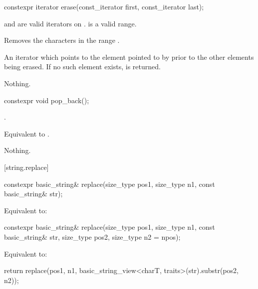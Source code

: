 %
\begin{itemdecl}
constexpr iterator erase(const_iterator first, const_iterator last);
\end{itemdecl}

\begin{itemdescr}
\pnum
\expects
{} and  are valid iterators on
.  is a valid range.

\pnum
\effects
Removes the characters in the range
\tcode{[first, last)}.

\pnum
\returns
An iterator which points to the element pointed to by  prior to
the other elements being erased.
If no such element exists,
is returned.

\pnum
\throws
Nothing.
\end{itemdescr}

%
\begin{itemdecl}
constexpr void pop_back();
\end{itemdecl}

\begin{itemdescr}
\pnum
\expects
{}.

\pnum
\effects
Equivalent to .

\pnum
\throws
Nothing.
\end{itemdescr}

[string.replace]{}

%
\begin{itemdecl}
constexpr basic_string& replace(size_type pos1, size_type n1, const basic_string& str);
\end{itemdecl}

\begin{itemdescr}
\pnum
\effects
Equivalent to: 
\end{itemdescr}

%
\begin{itemdecl}
constexpr basic_string& replace(size_type pos1, size_type n1, const basic_string& str,
                                size_type pos2, size_type n2 = npos);
\end{itemdecl}

\begin{itemdescr}
\pnum
\effects
Equivalent to:
\begin{codeblock}
return replace(pos1, n1, basic_string_view<charT, traits>(str).substr(pos2, n2));
\end{codeblock}
\end{itemdescr}

